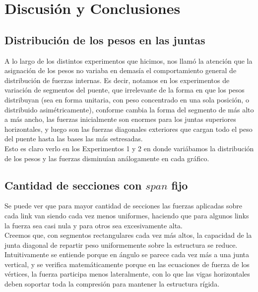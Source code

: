 \section{Discusión y Conclusiones}

\subsection{Distribución de los pesos en las juntas}

A lo largo de los distintos experimentos que hicimos, nos llamó la atención que la asignación de los pesos no variaba en demasía el comportamiento general de distribución de fuerzas internas. Es decir, notamos en los experimentos de variación de segmentos del puente, que irrelevante de la forma en que los pesos distribuyan (sea en forma unitaria, con peso concentrado en una sola posición, o distribuido asimétricamente), conforme cambia la forma del segmento de más alto a más ancho, las fuerzas inicialmente son enormes para los juntas superiores horizontales, y luego son las fuerzas diagonales exteriores que cargan todo el peso del puente hasta las bases las más estresadas.\\

Esto es claro verlo en los Experimentos 1 y 2 en donde variábamos la distribución de los pesos y las fuerzas disminuían análogamente en cada gráfico.

\subsection{Cantidad de secciones con $span$ fijo}

Se puede ver que para mayor cantidad de secciones las fuerzas aplicadas sobre cada link van siendo cada vez menos uniformes, haciendo que para algunos links la fuerza sea casi nula y para otros sea excesivamente alta.\\

Creemos que, con segmentos rectangulares cada vez más altos, la capacidad de la junta diagonal de repartir peso uniformemente sobre la estructura se reduce. Intuitivamente se entiende porque en ángulo se parece cada vez más a una junta vertical, y se verifica matemáticamente porque en las ecuaciones de fuerza de los vértices, la fuerza participa menos lateralmente, con lo que las vigas horizontales deben soportar toda la compresión para mantener la estructura rígida.

